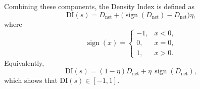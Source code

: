\documentclass[12pt]{imsart}
\theoremstyle{plain}
\theoremstyle{remark}
\begin{document}
Combining these components, the Density Index is defined as
\[
\mathrm{DI}(s)
=
D_{\mathrm{net}}
+
\bigl(
\operatorname{sign}(D_{\mathrm{net}})
-
D_{\mathrm{net}}
\bigr)\eta,
\]
where
\[
\operatorname{sign}(x)
=
\begin{cases}
-1, & x<0,\\
0,  & x=0,\\
1,  & x>0.
\end{cases}
\]
Equivalently,
\[
\mathrm{DI}(s)
=
(1-\eta)D_{\mathrm{net}}
+
\eta\,\operatorname{sign}(D_{\mathrm{net}}),
\]
which shows that \(\mathrm{DI}(s)\in[-1,1]\).





\end{document}
